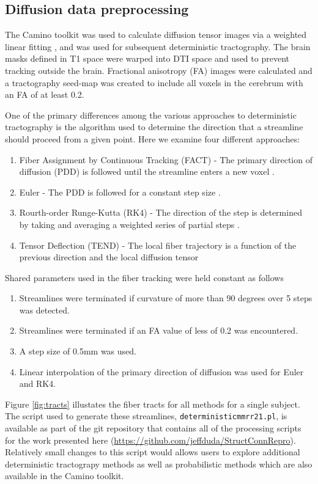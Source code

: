 \documentclass{frontiersSCNS} %
\begin{document}
\subsection{Diffusion data preprocessing}
The Camino toolkit \citep{Cook2006} was used to calculate diffusion tensor images via a
weighted linear fitting \citep{Basser1994c,Salvador2005b}, and was 
used for subsequent deterministic tractography. The brain masks defined
in T1 space were warped into DTI space and used to prevent tracking outside the brain. 
Fractional anisotropy (FA) images were calculated and a
tractography seed-map was created to include all voxels in the cerebrum with an FA of at
least 0.2. 

One of the primary differences among the various approaches to
deterministic tractography is the algorithm used to determine the
direction that a streamline should proceed from a given point. Here we
examine four different approaches:

\begin{enumerate}
\item Fiber Assignment by Continuous Tracking (FACT) - The primary
  direction of diffusion (PDD) is followed until the streamline enters
  a new voxel \citep{Xue1999}.
\item Euler -  The PDD is followed for a constant step size \citep{Basser2000}.
\item Rourth-order Runge-Kutta (RK4) - The direction of the step is determined
 by taking and averaging a weighted series of partial steps \citep{Basser2000}.
\item Tensor Deflection (TEND) - The local fiber trajectory is a function of the previous
direction and the local diffusion tensor \citep{Lazar2003}
\end{enumerate}

Shared parameters used in the fiber tracking were held constant as follows
\begin{enumerate}
\item Streamlines were terminated if curvature of more than 90 degrees over 5 steps was detected. 
\item Streamlines were terminated if an FA value of less of 0.2 was encountered. 
\item A step size of 0.5mm was used. 
\item Linear interpolation of the primary direction of diffusion was used for Euler and RK4. 
\end{enumerate}

Figure \ref{fig:tracts} illustates the fiber tracts for all methods for a single subject. The script used to generate these streamlines,
\texttt{deterministic\textunderscore mmrr21.pl}, is available as part of the git
repository that contains all of the processing scripts for the work
presented here (\url{https://github.com/jeffduda/StructConnRepro}). Relatively small
changes to this script would allows users to explore additional
deterministic tractograpy methods as well as probabilistic methods
which are also available in the Camino toolkit.
\end{document}
